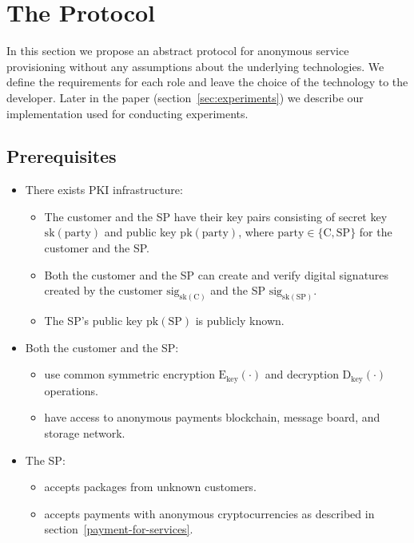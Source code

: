 \documentclass{ieeeaccess}
\begin{document}
\section{The Protocol}\label{sec:protocol}
In this section we propose an abstract protocol for anonymous service provisioning without any assumptions about the underlying technologies. We define the requirements for each role and leave the choice of the technology to the developer. Later in the paper (section~\ref{sec:experiments}) we describe our implementation used for conducting experiments.

\subsection{Prerequisites}

\begin{itemize}
\item There exists PKI infrastructure:
    \begin{itemize}
        \item The customer and the SP have their key pairs consisting of secret key $\mathrm{sk}(\mathrm{party})$ and public key $\mathrm{pk}(\mathrm{party})$, where $\mathrm{party} \in \{\mathrm{C}, \mathrm{SP}\}$ for the customer and the SP.
        \item Both the customer and the SP can create and verify digital signatures created by the customer $\mathrm{sig}_{\mathrm{sk}(\mathrm{C})}$ and the SP $\mathrm{sig}_{\mathrm{sk}(\mathrm{SP})}$.
        \item The SP's public key $\mathrm{pk}(\mathrm{SP})$ is publicly known.
    \end{itemize}
    
\item Both the customer and the SP:
    \begin{itemize}
        \item use common symmetric encryption $\mathrm{E}_\mathrm{key}(\cdot)$ and decryption $\mathrm{D}_\mathrm{key}(\cdot)$ operations.
        \item have access to anonymous payments blockchain, message board, and storage network.
    \end{itemize}

\item The SP:
    \begin{itemize}
        \item accepts packages from unknown customers.
        \item accepts payments with anonymous cryptocurrencies as described in section~\ref{payment-for-services}.
    \end{itemize}
    

\end{itemize}
\end{document}
